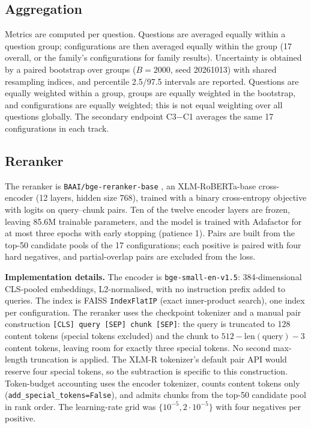 \documentclass[conference]{IEEEtran}
\begin{document}
\subsection{Aggregation}
Metrics are computed per question. Questions are averaged equally within a question group; configurations are then averaged equally within the group (17 overall, or the family's configurations for family results). Uncertainty is obtained by a paired bootstrap over groups ($B=2000$, seed 20261013) with shared resampling indices, and percentile 2.5/97.5 intervals are reported. Questions are equally weighted within a group, groups are equally weighted in the bootstrap, and configurations are equally weighted; this is not equal weighting over all questions globally. The secondary endpoint C3$-$C1 averages the same 17 configurations in each track.

\subsection{Reranker}
The reranker is \texttt{BAAI/bge-reranker-base} \cite{bge_reranker}, an XLM-RoBERTa-base cross-encoder (12 layers, hidden size 768), trained with a binary cross-entropy objective with logits on query--chunk pairs. Ten of the twelve encoder layers are frozen, leaving 85.6M trainable parameters, and the model is trained with Adafactor for at most three epochs with early stopping (patience 1). Pairs are built from the top-50 candidate pools of the 17 configurations; each positive is paired with four hard negatives, and partial-overlap pairs are excluded from the loss.

\textbf{Implementation details.}
The encoder is \texttt{bge-small-en-v1.5}: 384-dimensional CLS-pooled embeddings, L2-normalised, with no instruction prefix added to queries. The index is FAISS \texttt{IndexFlatIP} (exact inner-product search), one index per configuration. The reranker uses the checkpoint tokenizer and a manual pair construction \texttt{[CLS] query [SEP] chunk [SEP]}: the query is truncated to 128 content tokens (special tokens excluded) and the chunk to $512-\mathrm{len}(\mathrm{query})-3$ content tokens, leaving room for exactly three special tokens. No second max-length truncation is applied. The XLM-R tokenizer's default pair API would reserve four special tokens, so the subtraction is specific to this construction. Token-budget accounting uses the encoder tokenizer, counts content tokens only (\texttt{add\_special\_tokens=False}), and admits chunks from the top-50 candidate pool in rank order. The learning-rate grid was $\{10^{-5},2\cdot10^{-5}\}$ with four negatives per positive.
\end{document}
